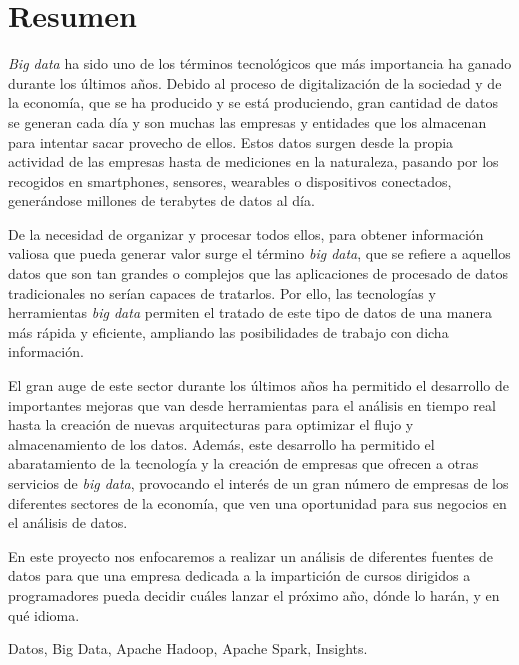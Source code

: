 \chapter*{Resumen}

\begin{abstractEs}
	\textit{Big data} ha sido uno de los términos tecnológicos que más importancia ha ganado durante los últimos años. Debido al proceso de digitalización de la sociedad y de la economía, que se ha producido y se está produciendo, gran cantidad de datos se generan cada día y son muchas las empresas y entidades que los almacenan para intentar sacar provecho de ellos. Estos datos surgen desde la propia actividad de las empresas hasta de mediciones en la naturaleza, pasando por los recogidos en smartphones, sensores, wearables o dispositivos conectados, generándose millones de terabytes de datos al día.
	
	De la necesidad de organizar y procesar todos ellos, para obtener información valiosa que pueda generar valor surge el término \textit{big data}, que se refiere a aquellos datos que son tan grandes o complejos que las aplicaciones de procesado de datos tradicionales no serían capaces de tratarlos. Por ello, las tecnologías y herramientas \textit{big data} permiten el tratado de este tipo de datos de una manera más rápida y eficiente, ampliando las posibilidades de trabajo con dicha información.
	
	El gran auge de este sector durante los últimos años ha permitido el desarrollo de importantes mejoras que van desde herramientas para el análisis en tiempo real hasta la creación de nuevas arquitecturas para optimizar el flujo y almacenamiento de los datos. Además, este desarrollo ha permitido el abaratamiento de la tecnología y la creación de empresas que ofrecen a otras servicios de \textit{big data}, provocando el interés de un gran número de empresas de los diferentes sectores de la economía, que ven una oportunidad para sus negocios en el análisis de datos.
	
	En este proyecto nos enfocaremos a realizar un análisis de diferentes fuentes de datos para que una empresa dedicada a la impartición de cursos dirigidos a programadores pueda decidir cuáles lanzar el próximo año, dónde lo harán, y en qué idioma.	
\end{abstractEs}

\begin{keywordsEs}
	Datos, Big Data, Apache Hadoop, Apache Spark, Insights.
\end{keywordsEs}


